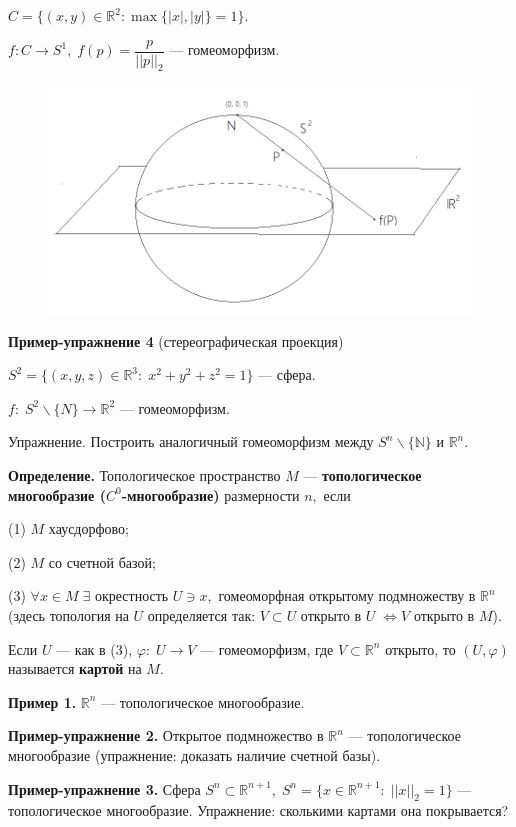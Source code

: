 \documentclass[12pt,a4paper]{article}
\begin{document}
$C = \{(x, y) \in \mathbb{R}^{2}: \max\{|x|, |y|\} = 1\}.$ 

$f: C \to S^{1}, \; f(p) = \dfrac{p}{||p||_{2}}$ --- гомеоморфизм. 

\begin{figure}[htpb]
	\centering
	\includegraphics[width=0.8\linewidth]{lect5_3.png}
\end{figure}

\textbf{Пример-упражнение 4} (стереографическая проекция)

$S^{2} = \{(x, y, z) \in \mathbb{R}^{3}: \; x^{2} + y^{2} + z^{2} = 1\}$ --- сфера. 

$f: \; S^{2} \backslash \{N\} \to \mathbb{R}^{2}$ --- гомеоморфизм. 

Упражнение. Построить аналогичный гомеоморфизм между $S^{n} \backslash \{\mathbb{N}\}$ и $\mathbb{R}^{n}.$ 

\textbf{Определение.} Топологическое пространство $M$ --- \textbf{топологическое многообразие ($C^{0}$-многообразие)} размерности $n,$ если 

(1) $M$ хаусдорфово; 

(2) $M$ со счетной базой; 

(3) $\forall x \in M \; \exists$ окрестность $U \ni x,$ гомеоморфная открытому подмножеству в $\mathbb{R}^{n}$ (здесь топология на $U$ определяется так: $V \subset U$ открыто в $U \; \Leftrightarrow V$ открыто в $M$). 

Если $U$ --- как в (3), $\varphi: \; U \to V$ --- гомеоморфизм, где $V \subset \mathbb{R}^{n}$ открыто, то $(U, \varphi)$ называется \textbf{картой} на $M.$ 

\textbf{Пример 1.} $\mathbb{R}^{n}$ --- топологическое многообразие. 

\textbf{Пример-упражнение 2.} Открытое подмножество в $\mathbb{R}^{n}$ --- топологическое многообразие (упражнение: доказать наличие счетной базы). 

\textbf{Пример-упражнение 3.} Сфера $S^{n} \subset \mathbb{R}^{n + 1}, \; S^{n} = \{x \in \mathbb{R}^{n + 1}: \; ||x||_{2} = 1\}$ --- топологическое многообразие. Упражнение: сколькими картами она покрывается? 
\end{document}

